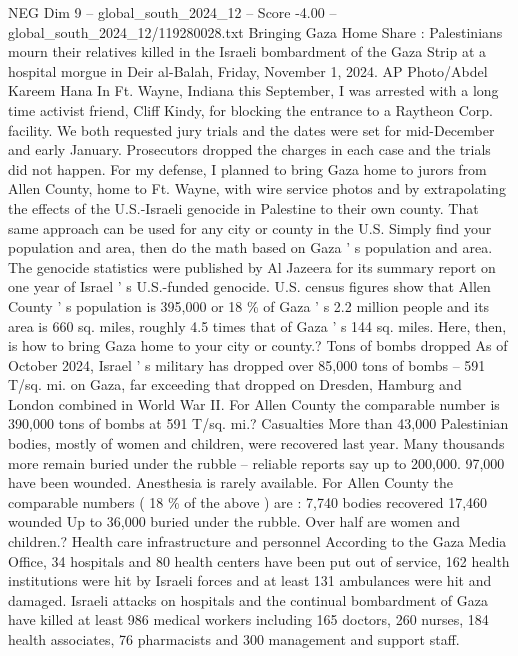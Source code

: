 \begin{textsample}{NEG Dim 9 – global\_south\_2024\_12 – Score -4.00 – global\_south\_2024\_12/119280028.txt}  \label{ex:f9_neg_128}
Bringing Gaza Home Share : Palestinians mourn their relatives killed in the Israeli bombardment of the Gaza Strip at a hospital morgue in Deir al-Balah, Friday, November 1, 2024.
AP Photo/Abdel Kareem Hana In Ft.
Wayne, Indiana this September, I was arrested with a long time activist friend, Cliff Kindy, for blocking the entrance to a Raytheon Corp. facility.
We both requested jury trials and the dates were set for mid-December and early January.
Prosecutors dropped the charges in each case and the trials did not happen.
For my defense, I planned to bring Gaza home to jurors from Allen County, home to Ft.
Wayne, with wire service photos and by extrapolating the effects of the U.S.-Israeli genocide in Palestine to their own county.
That same approach can be used for any city or county in the U.S.
Simply find your population and area, then do the math based on Gaza ' s population and area.
The genocide statistics were published by Al Jazeera for its summary report on one year of Israel ' s U.S.-funded genocide.
U.S. census figures show that Allen County ' s population is 395,000 or 18 \% of Gaza ' s 2.2 million people and its area is 660 sq. miles, roughly 4.5 times that of Gaza ' s 144 sq. miles.
Here, then, is how to bring Gaza home to your city or county.?
Tons of bombs dropped As of October 2024, Israel ' s military has dropped over 85,000 tons of bombs -- 591 T/sq. mi. on Gaza, far exceeding that dropped on Dresden, Hamburg and London combined in World War II.
For Allen County the comparable number is 390,000 tons of bombs at 591 T/sq. mi.?
Casualties More than 43,000 Palestinian bodies, mostly of women and children, were recovered last year.
Many thousands more remain buried under the rubble -- reliable reports say up to 200,000. 97,000 have been wounded.
Anesthesia is rarely available.
For Allen County the comparable numbers ( 18 \% of the above ) are : 7,740 bodies recovered 17,460 wounded Up to 36,000 buried under the rubble.
Over half are women and children.?
Health care infrastructure and personnel According to the Gaza Media Office, 34 hospitals and 80 health centers have been put out of service, 162 health institutions were hit by Israeli forces and at least 131 ambulances were hit and damaged.
Israeli attacks on hospitals and the continual bombardment of Gaza have killed at least 986 medical workers including 165 doctors, 260 nurses, 184 health associates, 76 pharmacists and 300 management and support staff.

\end{textsample}
